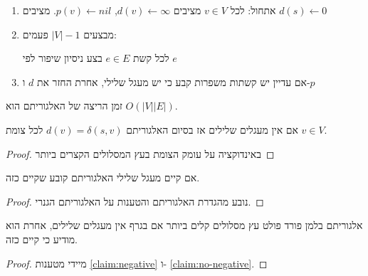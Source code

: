 \begin{enumerate}
\item
אתחול: לכל
$v \in V$
מציבים 
$d(v) \leftarrow \infty$, 
$p(v) \leftarrow nil$.
מציבים
$d(s) \leftarrow 0$
\item
מבצעים 
$|V| - 1$
פעמים:
\begin{enumerate}
לכל קשת 
$e \in E$
בצע ניסיון שיפור לפי $e$
\end{enumerate}
\item
אם עדיין יש קשתות משפרות קבע כי יש מעגל שלילי, אחרת החזר את $d$ ו-$p$
\end{enumerate}

זמן הריצה של האלגוריתם הוא 
$O(|V||E|)$.

\begin{claim}
\label{claim:no-negative}
אם אין מעגלים שלילים אז בסיום האלגוריתם
$d(v) = \delta(s,v)$
לכל צומת 
$v \in V$.
\end{claim}

\begin{proof}
באינדוקציה על עומק הצומת בעץ המסלולים הקצרים ביותר
\end{proof}

\begin{claim}
\label{claim:negative}
אם קיים מעגל שלילי האלגוריתם קובע שקיים כזה.
\end{claim}

\begin{proof}
נובע מהגדרת האלגוריתם והטענות על האלגוריתם הגנרי.
\end{proof}

\begin{theorem}
אלגוריתם בלמן פורד פולט עץ מסלולים קלים ביותר אם בגרף אין מעגלים שלילים, 
אחרת הוא מודיע כי קיים כזה.
\end{theorem}

\begin{proof}
מיידי מטענות 
\ref{claim:negative}
ו-%
\ref{claim:no-negative}.
\end{proof}

